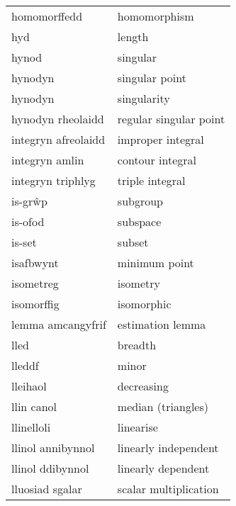 \begin{supertabular}{p{0.22\textwidth}p{0.22\textwidth}}
                   homomorffedd &                     homomorphism \\
                            hyd &                           length \\
                          hynod &                         singular \\
                        hynodyn &                   singular point \\
                        hynodyn &                      singularity \\
              hynodyn rheolaidd &           regular singular point \\
            integryn afreolaidd &                improper integral \\
                 integryn amlin &                 contour integral \\
              integryn triphlyg &                  triple integral \\
                        is-grŵp &                         subgroup \\
                        is-ofod &                         subspace \\
                         is-set &                           subset \\
                      isafbwynt &                    minimum point \\
                      isometreg &                         isometry \\
                     isomorffig &                       isomorphic \\
              lemma amcangyfrif &                 estimation lemma \\
                           lled &                          breadth \\
                         lleddf &                            minor \\
                       lleihaol &                       decreasing \\
                     llin canol &               median (triangles) \\
                     llinelloli &                        linearise \\
              llinol annibynnol &             linearly independent \\
               llinol ddibynnol &               linearly dependent \\
                lluosiad sgalar &            scalar multiplication \\

\end{supertabular}
